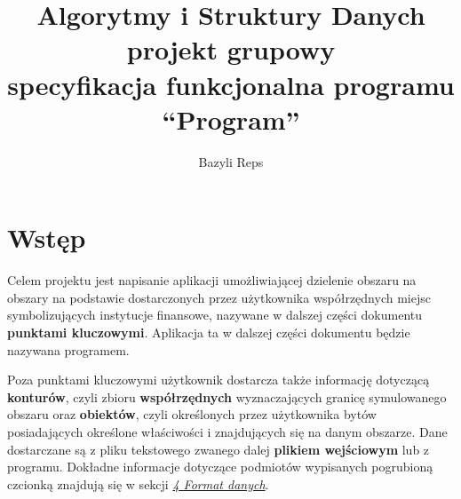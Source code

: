 \documentclass[hidelinks,10pt,a4paper]{article}
\newcommand\tab[1][0.5cm]{\hspace*{#1}}
\begin{document}
\title{Algorytmy i Struktury Danych \\ projekt grupowy \\ specyfikacja funkcjonalna programu \\``Program''}
\author{Bazyli Reps}
\maketitle

\newpage

\tableofcontents

\newpage

\section{Wstęp}
\tab Celem projektu jest napisanie aplikacji umożliwiającej dzielenie obszaru na obszary na podstawie dostarczonych przez użytkownika współrzędnych miejsc symbolizujących instytucje finansowe, nazywane w dalszej części dokumentu \textbf{punktami kluczowymi}.
Aplikacja ta w dalszej części dokumentu będzie nazywana programem.

Poza punktami kluczowymi użytkownik dostarcza także informację dotyczącą \textbf{konturów}, czyli zbioru \textbf{współrzędnych} wyznaczających granicę symulowanego obszaru oraz \textbf{obiektów}, czyli określonych przez użytkownika bytów posiadających określone właściwości i znajdujących się na danym obszarze. Dane dostarczane są z pliku tekstowego zwanego dalej \textbf{plikiem wejściowym} lub z programu.
Dokładne informacje dotyczące podmiotów wypisanych pogrubioną czcionką znajdują się w sekcji \hyperref[sec:daneWej]{\textit{4 Format danych}}.
\end{document}
